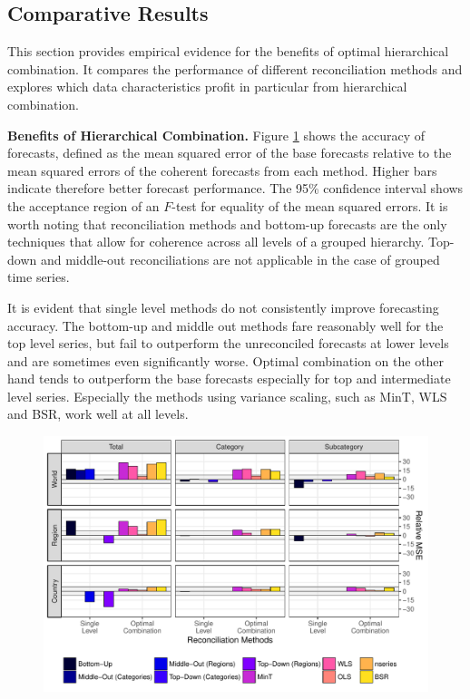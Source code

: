 \documentclass[a4paper,fleqn,11pt]{article}
\begin{document}
\subsection{Comparative Results}

This section provides empirical evidence for the benefits of optimal hierarchical combination. It compares the performance of different reconciliation methods and explores which data characteristics profit in particular from hierarchical combination.

\noindent\textbf{Benefits of Hierarchical Combination.} Figure \ref{fig:rmse} shows the accuracy of forecasts, defined as the mean squared error of the base forecasts relative to the mean squared errors of the coherent forecasts from each method. Higher bars indicate therefore better forecast performance. The 95\% confidence interval shows the acceptance region of an $F$-test for equality of the mean squared errors. It is worth noting that reconciliation methods and bottom-up forecasts are the only techniques that allow for coherence across all levels of a grouped hierarchy. Top-down and middle-out reconciliations are not applicable in the case of grouped time series.

It is evident that single level methods do not consistently improve forecasting accuracy. The bottom-up and middle out methods fare reasonably well for the top level series, but fail to outperform the unreconciled forecasts at lower levels and are sometimes even significantly worse. Optimal combination on the other hand tends to outperform the base forecasts especially for top and intermediate level series. Especially the methods using variance scaling, such as MinT, WLS and BSR, work well at all levels.

\begin{figure}[H]
	\includegraphics[width=\textwidth]{fig/fig_eval_rmse_relative}
	\label{fig:rmse}
\end{figure}
\end{document}
